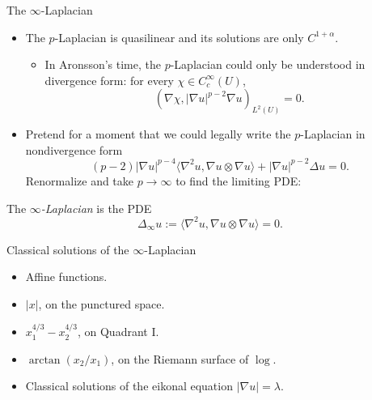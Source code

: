 \documentclass[10pt]{beamer}
\begin{document}
\begin{frame}{The $\infty$-Laplacian}
\begin{itemize}
\item The $p$-Laplacian is quasilinear and its solutions are only $C^{1 + \alpha}$.
\begin{itemize}
\item In Aronsson's time, the $p$-Laplacian could only be understood in divergence form: for every $\chi \in C^\infty_c(U)$,
$$(\nabla \chi, |\nabla u|^{p - 2} \nabla u)_{L^2(U)} = 0.$$
\end{itemize}
\item Pretend for a moment that we could legally write the $p$-Laplacian in nondivergence form 
$$(p - 2) |\nabla u|^{p - 4} \langle \nabla^2 u, \nabla u \otimes \nabla u\rangle + |\nabla u|^{p - 2} \Delta u = 0.$$
Renormalize and take $p \to \infty$ to find the limiting PDE: \pause
\end{itemize} 

\begin{definition}
The \emph{$\infty$-Laplacian} is the PDE 
$$\Delta_\infty u := \langle \nabla^2 u, \nabla u \otimes \nabla u\rangle = 0.$$
\end{definition}
\end{frame}

\begin{frame}{Classical solutions of the $\infty$-Laplacian}
\begin{itemize}
\item Affine functions.
\item $|x|$, on the punctured space.
\item $x_1^{4/3} - x_2^{4/3}$, on Quadrant I.
\item $\arctan(x_2/x_1)$, on the Riemann surface of $\log$.
\item Classical solutions of the eikonal equation $|\nabla u| = \lambda$.
\end{itemize}
\end{frame}
\end{document}
